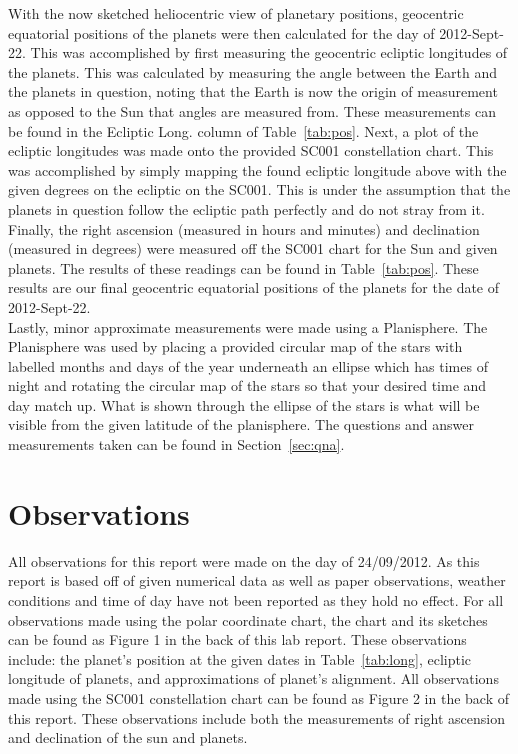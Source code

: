 \documentclass{article}
\begin{document}
With the now sketched heliocentric view of planetary positions, geocentric equatorial positions of the planets were then
calculated for the day of 2012-Sept-22. This was accomplished by first measuring the geocentric ecliptic longitudes of the planets.
This was calculated by measuring the angle between the Earth and the planets in question, noting that the Earth is now the origin 
of measurement as opposed to the Sun that angles are measured from. These measurements can be found in the 
Ecliptic Long. column of Table~\ref{tab:pos}. Next, a plot of the ecliptic longitudes was made onto the provided SC001
constellation chart. This was accomplished by simply mapping the found ecliptic longitude above with the given degrees on
the ecliptic on the SC001. This is under the assumption that the planets in question follow the ecliptic path perfectly and do not
stray from it. Finally, the right ascension (measured in hours and minutes) and declination (measured in degrees)
were measured off the SC001 chart for the Sun and given planets. The results of these readings can be found in Table~\ref{tab:pos}.
These results are our final geocentric equatorial positions of the planets for the date of 2012-Sept-22.\\

Lastly, minor approximate measurements were made using a Planisphere. The Planisphere was used by placing a provided circular
map of the stars with labelled months and days of the year underneath an ellipse which has times of night and rotating the 
circular map of the stars so that your desired time and day match up. What is shown through the ellipse of the stars is what will 
be visible from the given latitude of the planisphere. The questions and answer measurements taken can be found in
Section~\ref{sec:qna}.\\



\section{Observations}

All observations for this report were made on the day of 24/09/2012. As this report is based off of given numerical data as
well as paper observations, weather conditions and time of day have not been reported as they hold no effect. For all 
observations made using the polar coordinate chart, the chart and its sketches can be found as Figure 1 in the back of
this lab report. These observations include: the planet's position at the given dates in Table~\ref{tab:long}, ecliptic 
longitude of planets, and approximations of planet's alignment. All observations made using the SC001 constellation
chart can be found as Figure 2 in the back of this report. These observations include both the measurements of right
ascension and declination of the sun and planets.\\
\end{document}
